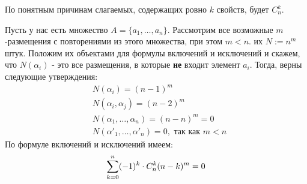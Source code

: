 \begin{note}
	По понятным причинам слагаемых, содержащих ровно $k$ свойств, будет $C_n^k$.
\end{note}

\begin{corollary}
	Пусть у нас есть множество $A = \{a_1, \ldots, a_n\}$. Рассмотрим все возможные $m$-размещения с повторениями из этого множества, при этом $m < n$. их $N := n^m$ штук. Положим их объектами для формулы включений и исключений и скажем, что $N(\alpha_i)$ - это все размещения, в которые \textbf{не} входит элемент $a_i$. Тогда, верны следующие утверждения:
	\begin{align*}
		&N(\alpha_i) = (n - 1)^m
		\\
		&N(\alpha_i, \alpha_j) = (n - 2)^m
		\\
		&N(\alpha_1, \ldots, \alpha_n) = (n - n)^m = 0
		\\
		&N(\alpha'_1, \ldots, \alpha'_n) = 0, \text{ так как } m < n
	\end{align*}
	По формуле включений и исключений имеем:
	\[
		\sum\limits_{k = 0}^n (-1)^k \cdot C_n^k (n - k)^m = 0
	\]
\end{corollary}